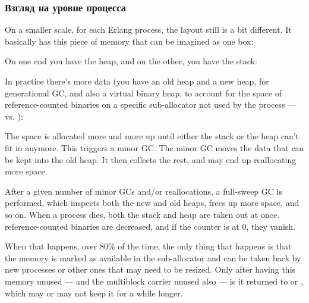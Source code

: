 \documentclass[11pt, oneside]{book}   	%
\begin{document}
\subsubsection{Взгляд на уровне процесса}
\label{subsec:memory-process-level}

On a smaller scale, for each Erlang process, the layout still is a bit different. It basically has this piece of memory that can be imagined as one box:

\begin{VerbatimText}
[                  ]
\end{VerbatimText}

On one end you have the heap, and on the other, you have the stack:

\begin{VerbatimText}
\end{VerbatimText}

In practice there's more data (you have an old heap and a new heap, for generational GC, and also a virtual binary heap, to account for the space of reference-counted binaries on a specific sub-allocator not used by the process —  vs. ):

\begin{VerbatimText}
\end{VerbatimText}

The space is allocated more and more up until either the stack or the heap can't fit in anymore. This triggers a minor GC. The minor GC moves the data that can be kept into the old heap. It then collects the rest, and may end up reallocating more space.

After a given number of minor GCs and/or reallocations, a full-sweep GC is performed, which inspects both the new and old heaps, frees up more space, and so on. When a process dies, both the stack and heap are taken out at once. reference-counted binaries are decreased, and if the counter is at 0, they vanish.

When that happens, over 80\% of the time, the only thing that happens is that the memory is marked as available in the sub-allocator and can be taken back by new processes or other ones that may need to be resized. Only after having this memory unused — and the multiblock carrier unused also — is it returned to  or , which may or may not keep it for a while longer.
\end{document}

